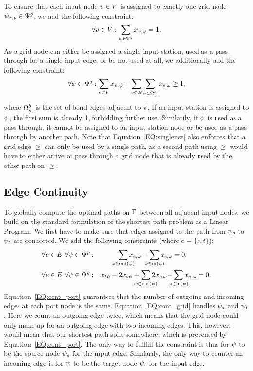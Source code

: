 \documentclass[sigconf]{acmart}
\begin{document}
To ensure that each input node $v \in V$ is assigned to exactly one grid node $\psi_{x, y} \in \Psi^g$, we add the following constraint:
%
\begin{equation}
  \forall v \in V: \sum_{\psi \in \Psi^g} x_{v,\psi} = 1. \label{EQ:onegvperiv}
\end{equation}
%
As a grid node can either be assigned a single input station, used as a pass-through for a single input edge, or be not used at all, we additionally add the following constraint:
%
\begin{equation}
  \forall \psi \in \Psi^g: \sum_{v \in V} x_{v,\psi} + \sum_{e \in E} \sum_{\omega \in \Omega^b_\psi} x_{e,\omega} \geq 1, \label{EQ:singleuse}
\end{equation}
%
where $\Omega^b_\psi$ is the set of bend edges adjacent to $\psi$. 
If an input station is assigned to $\psi$, the first sum is already 1, forbidding further use.
Similarily, if $\psi$ is used as a pass-through, it cannot be assigned to an input station node or be used as a pass-through by another path.
Note that Equation~\ref{EQ:singleuse} also enforces that a grid edge $\ge$ can only be used by a single path, as a second path using $\ge$ would have to either arrive or pass through a grid node that is already used by the other path on $\ge$.

\subsection{Edge Continuity}

To globally compute the optimal paths on $\Gamma$ between all adjacent input nodes, we build on the standard formulation of the shortest path problem as a Linear Program.
We first have to make sure that edges assigned to the path from $\psi_s$ to $\psi_t$ are connected.
We add the following constraints (where $e = \{s, t\}$):
%
\newcommand\Psum[1]{\sum_{\makebox[0pt]{$\scriptstyle#1$}}}
%
\begin{align}
	&\forall \ie \in \iE\ \forall \gv \in \gV^p:& \Psum{\ge \in \text{out}(\gv)} \geused{\ie}{\ge} - \Psum{\ge \in \text{in}(\gv)} \geused{\ie}{\ge}& = 0, \label{EQ:cont_port} \\
	&\forall \ie \in \iE\ \forall \gv \in \gV^g:& x_{t\psi} - 2x_{s\psi} + \Psum{\ge \in \text{out}(\gv)} 2\geused{\ie}{\ge} - &\Psum{\ge \in \text{in}(\gv)} \geused{\ie}{\ge} = 0. \label{EQ:cont_grid}
\end{align}
%
Equation~\ref{EQ:cont_port} guarantees that the number of outgoing and incoming edges at each port node is the same.
%
Equation~\ref{EQ:cont_grid} handles $\psi_s$ and $\psi_t$.
Here we count an outgoing edge twice, which means that the grid node could only make up for an outgoing edge with two incoming edges.
This, however, would mean that our shortest path split somewhere, which is prevented by Equation~\ref{EQ:cont_port}.
The only way to fullfill the constraint is thus for $\psi$ to be the source node $\psi_s$ for the input edge.
Similarily, the only way to counter an incoming edge is for $\psi$ to be the target node $\psi_t$ for the input edge.
\end{document}
